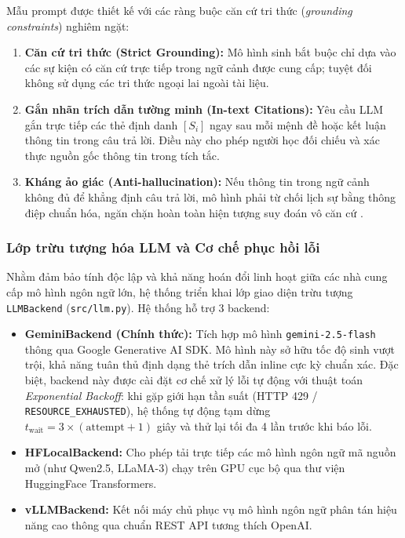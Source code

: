 ﻿\documentclass[12pt]{article}
\begin{document}
Mẫu prompt được thiết kế với các ràng buộc căn cứ tri thức (\textit{grounding constraints}) nghiêm ngặt:
\begin{enumerate}[(1)]
    \item \textbf{Căn cứ tri thức (Strict Grounding):} Mô hình sinh bắt buộc chỉ dựa vào các sự kiện có căn cứ trực tiếp trong ngữ cảnh được cung cấp; tuyệt đối không sử dụng các tri thức ngoại lai ngoài tài liệu.
    \item \textbf{Gắn nhãn trích dẫn tường minh (In-text Citations):} Yêu cầu LLM gắn trực tiếp các thẻ định danh $[S_i]$ ngay sau mỗi mệnh đề hoặc kết luận thông tin trong câu trả lời. Điều này cho phép người học đối chiếu và xác thực nguồn gốc thông tin trong tích tắc.
    \item \textbf{Kháng ảo giác (Anti-hallucination):} Nếu thông tin trong ngữ cảnh không đủ để khẳng định câu trả lời, mô hình phải từ chối lịch sự bằng thông điệp chuẩn hóa, ngăn chặn hoàn toàn hiện tượng suy đoán vô căn cứ \cite{ji2023survey}.
\end{enumerate}

\subsubsection{Lớp trừu tượng hóa LLM và Cơ chế phục hồi lỗi}
Nhằm đảm bảo tính độc lập và khả năng hoán đổi linh hoạt giữa các nhà cung cấp mô hình ngôn ngữ lớn, hệ thống triển khai lớp giao diện trừu tượng \texttt{LLMBackend} (\texttt{src/llm.py}). Hệ thống hỗ trợ 3 backend:
\begin{itemize}
    \item \textbf{GeminiBackend (Chính thức):} Tích hợp mô hình \texttt{gemini-2.5-flash} thông qua Google Generative AI SDK. Mô hình này sở hữu tốc độ sinh vượt trội, khả năng tuân thủ định dạng thẻ trích dẫn inline cực kỳ chuẩn xác. Đặc biệt, backend này được cài đặt cơ chế xử lý lỗi tự động với thuật toán \textit{Exponential Backoff}: khi gặp giới hạn tần suất (HTTP 429 / \texttt{RESOURCE\_EXHAUSTED}), hệ thống tự động tạm dừng $t_{\text{wait}} = 3 \times (\text{attempt} + 1)$ giây và thử lại tối đa 4 lần trước khi báo lỗi.
    \item \textbf{HFLocalBackend:} Cho phép tải trực tiếp các mô hình ngôn ngữ mã nguồn mở (như Qwen2.5, LLaMA-3) chạy trên GPU cục bộ qua thư viện HuggingFace Transformers.
    \item \textbf{vLLMBackend:} Kết nối máy chủ phục vụ mô hình ngôn ngữ phân tán hiệu năng cao thông qua chuẩn REST API tương thích OpenAI.
\end{itemize}
\end{document}
